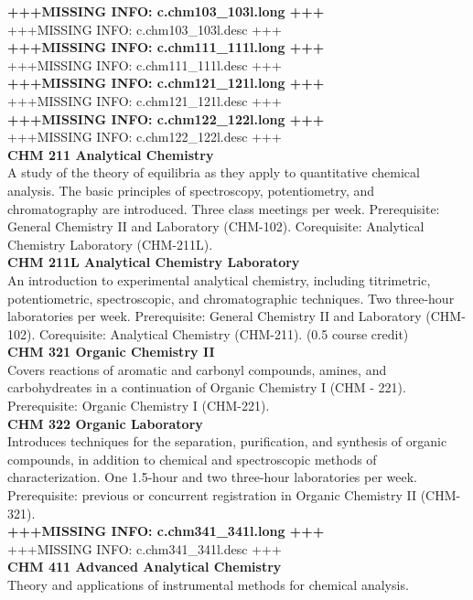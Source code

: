 \documentclass[
  letterpaper,
]{scrbook}
\begin{document}
\textbf{+++MISSING INFO: c.chm103\_103l.long +++}\\
+++MISSING INFO: c.chm103\_103l.desc +++\\
\textbf{+++MISSING INFO: c.chm111\_111l.long +++}\\
+++MISSING INFO: c.chm111\_111l.desc +++\\
\textbf{+++MISSING INFO: c.chm121\_121l.long +++}\\
+++MISSING INFO: c.chm121\_121l.desc +++\\
\textbf{+++MISSING INFO: c.chm122\_122l.long +++}\\
+++MISSING INFO: c.chm122\_122l.desc +++\\
\textbf{CHM 211 Analytical Chemistry}\\
A study of the theory of equilibria as they apply to quantitative
chemical analysis. The basic principles of spectroscopy, potentiometry,
and chromatography are introduced. Three class meetings per week.
Prerequisite: General Chemistry II and Laboratory (CHM-102).
Corequisite: Analytical Chemistry Laboratory (CHM-211L).\\
\textbf{CHM 211L Analytical Chemistry Laboratory}\\
An introduction to experimental analytical chemistry, including
titrimetric, potentiometric, spectroscopic, and chromatographic
techniques. Two three-hour laboratories per week. Prerequisite: General
Chemistry II and Laboratory (CHM-102). Corequisite: Analytical Chemistry
(CHM-211). (0.5 course credit)\\
\textbf{CHM 321 Organic Chemistry II}\\
Covers reactions of aromatic and carbonyl compounds, amines, and
carbohydreates in a continuation of Organic Chemistry I (CHM - 221).
Prerequisite: Organic Chemistry I (CHM-221).\\
\textbf{CHM 322 Organic Laboratory}\\
Introduces techniques for the separation, purification, and synthesis of
organic compounds, in addition to chemical and spectroscopic methods of
characterization. One 1.5-hour and two three-hour laboratories per week.
Prerequisite: previous or concurrent registration in Organic Chemistry
II (CHM-321).\\
\textbf{+++MISSING INFO: c.chm341\_341l.long +++}\\
+++MISSING INFO: c.chm341\_341l.desc +++\\
\textbf{CHM 411 Advanced Analytical Chemistry}\\
Theory and applications of instrumental methods for chemical analysis.
\end{document}
